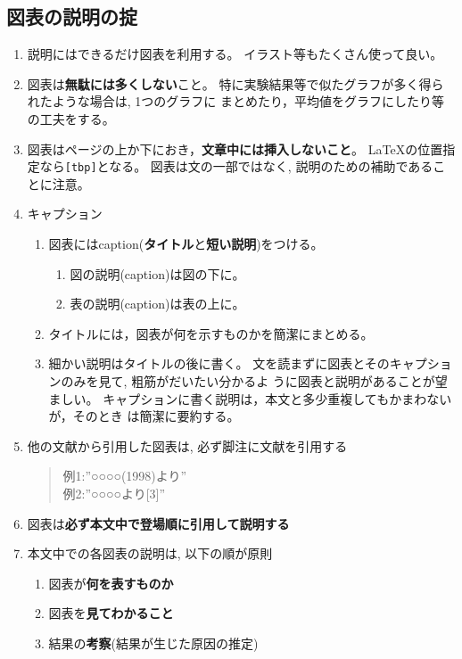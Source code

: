 \documentclass[12pt, ]{jsarticle}
\providecommand{\tightlist}{%
   \setlength{\itemsep}{0pt}\setlength{\parskip}{0pt}}
\begin{document}
\subsection{図表の説明の掟}\label{ux56f3ux8868ux306eux8aacux660eux306eux639f}

\begin{enumerate}
\item
  説明にはできるだけ図表を利用する。 イラスト等もたくさん使って良い。
\item
  図表は\textbf{無駄には多くしない}こと。
  特に実験結果等で似たグラフが多く得られたような場合は, 1つのグラフに
  まとめたり，平均値をグラフにしたり等の工夫をする。
\item
  図表はページの上か下におき，\textbf{文章中には挿入しないこと}。
  LaTeXの位置指定なら\lstinline![tbp]!となる。 図表は文の一部ではなく,
  説明のための補助であることに注意。
\item
  キャプション

  \begin{enumerate}
  \tightlist
  \item
    図表にはcaption(\textbf{タイトル}と\textbf{短い説明})をつける。

    \begin{enumerate}
    \tightlist
    \item
      図の説明(caption)は図の下に。
    \item
      表の説明(caption)は表の上に。
    \end{enumerate}
  \item
    タイトルには，図表が何を示すものかを簡潔にまとめる。
  \item
    細かい説明はタイトルの後に書く。
    文を読まずに図表とそのキャプションのみを見て, 粗筋がだいたい分かるよ
    うに図表と説明があることが望ましい。
    キャプションに書く説明は，本文と多少重複してもかまわないが，そのとき
    は簡潔に要約する。
  \end{enumerate}
\item
  他の文献から引用した図表は, 必ず脚注に文献を引用する

  \begin{quote}
  例1:''○○○○(1998)より''\\
  例2:''○○○○より{[}3{]}''
  \end{quote}
\item
  図表は\textbf{必ず本文中で登場順に引用して説明する}
\item
  本文中での各図表の説明は, 以下の順が原則

  \begin{enumerate}
  \tightlist
  \item
    図表が\textbf{何を表すものか}
  \item
    図表を\textbf{見てわかること}
  \item
    結果の\textbf{考察}(結果が生じた原因の推定)
  \end{enumerate}


\end{enumerate}
\end{document}
